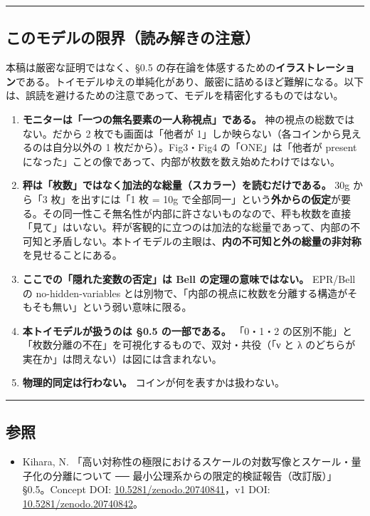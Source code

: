 \documentclass[11pt]{ltjsarticle}
\providecommand{\tightlist}{\setlength{\itemsep}{0pt}\setlength{\parskip}{0pt}}
\begin{document}
\begin{center}\rule{0.5\linewidth}{0.5pt}\end{center}

\subsection{このモデルの限界（読み解きの注意）}\label{ux3053ux306eux30e2ux30c7ux30ebux306eux9650ux754cux8aadux307fux89e3ux304dux306eux6ce8ux610f}

本稿は厳密な証明ではなく、§0.5
の存在論を体感するための\textbf{イラストレーション}である。トイモデルゆえの単純化があり、厳密に詰めるほど難解になる。以下は、誤読を避けるための注意であって、モデルを精密化するものではない。

\begin{enumerate}
\def\labelenumi{\arabic{enumi}.}
\item
  \textbf{モニターは「一つの無名要素の一人称視点」である。}
  神の視点の総数ではない。だから 2 枚でも画面は「他者が
  1」しか映らない（各コインから見えるのは自分以外の 1
  枚だから）。Fig3・Fig4 の「ONE」は「他者が present
  になった」ことの像であって、内部が枚数を数え始めたわけではない。
\item
  \textbf{秤は「枚数」ではなく加法的な総量（スカラー）を読むだけである。}
  30g から「3 枚」を出すには「1 枚 = 10g
  で全部同一」という\textbf{外からの仮定}が要る。その同一性こそ無名性が内部に許さないものなので、秤も枚数を直接「見て」はいない。秤が客観的に立つのは加法的な総量であって、内部の不可知と矛盾しない。本トイモデルの主眼は、\textbf{内の不可知と外の総量の非対称}を見せることにある。
\item
  \textbf{ここでの「隠れた変数の否定」は Bell の定理の意味ではない。}
  EPR/Bell の no-hidden-variables
  とは別物で、「内部の視点に枚数を分離する構造がそもそも無い」という弱い意味に限る。
\item
  \textbf{本トイモデルが扱うのは §0.5 の一部である。} 「0・1・2
  の区別不能」と「枚数分離の不在」を可視化するもので、双対・共役（「ν と
  λ のどちらが実在か」は問えない）は図には含まれない。
\item
  \textbf{物理的同定は行わない。} コインが何を表すかは扱わない。
\end{enumerate}

\begin{center}\rule{0.5\linewidth}{0.5pt}\end{center}

\subsection{参照}\label{ux53c2ux7167}

\begin{itemize}
\tightlist
\item
  Kihara, N.
  「高い対称性の極限におけるスケールの対数写像とスケール・量子化の分離について
  ── 最小公理系からの限定的検証報告（改訂版）」§0.5。Concept DOI:
  \href{https://doi.org/10.5281/zenodo.20740841}{10.5281/zenodo.20740841}，v1
  DOI:
  \href{https://doi.org/10.5281/zenodo.20740842}{10.5281/zenodo.20740842}。
\end{itemize}
\end{document}
